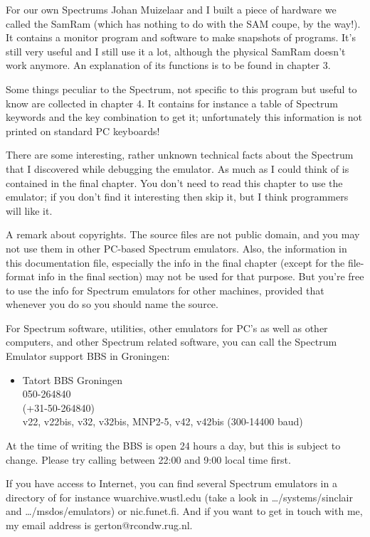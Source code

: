     For our own Spectrums Johan Muizelaar and I built a piece of hardware we
    called the SamRam (which has nothing to do with the SAM coupe, by the
    way!).  It contains a monitor program and software to make snapshots of
    programs.  It's still very useful and I still use it a lot, although the
    physical SamRam doesn't work anymore.  An explanation of its functions
    is to be found in chapter 3.

    Some things peculiar to the Spectrum, not specific to this program but
    useful to know are collected in chapter 4. It contains for instance a
    table of Spectrum keywords and the key combination to get it;
    unfortunately this information is not printed on standard PC keyboards!

    There are some interesting, rather unknown technical facts about the
    Spectrum that I discovered while debugging the emulator.  As much as I
    could think of is contained in the final chapter.  You don't need to
    read this chapter to use the emulator; if you don't find it interesting
    then skip it, but I think programmers will like it.

    A remark about copyrights.  The source files are not public domain, and
    you may not use them in other PC-based Spectrum emulators. Also, the
    information in this documentation file, especially the info in the final
    chapter (except for the file-format info in the final section) may not
    be used for that purpose.  But you're free to use the info for Spectrum
    emulators for other machines, provided that whenever you do so you
    should name the source.

    For Spectrum software, utilities, other emulators for PC's as well as
    other computers, and other Spectrum related software, you can call the
    Spectrum Emulator support BBS in Groningen:
\begin{itemize}
  \item[]
        Tatort BBS Groningen \\
        050-264840 \\
        (+31-50-264840) \\
        v22, v22bis, v32, v32bis, MNP2-5, v42, v42bis (300-14400 baud)
\end{itemize}
    At the time of writing the BBS is open 24 hours a day, but this is
    subject to change.  Please try calling between 22:00 and 9:00 local time
    first.

    If you have access to Internet, you can find several Spectrum emulators
    in a directory of for instance wuarchive.wustl.edu (take a look in
    \ldots/systems/sinclair and \ldots/msdos/emulators) or nic.funet.fi.
    And if you want to get in touch with me, my email address is
    gerton@rcondw.rug.nl.




